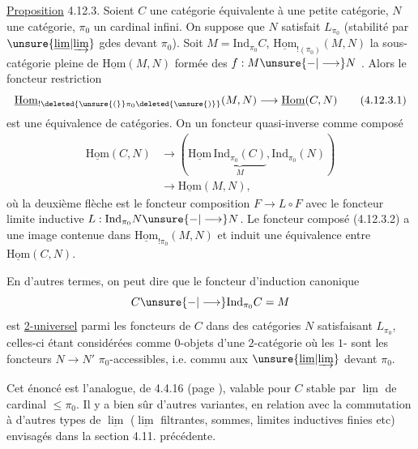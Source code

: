 \uline{Proposition} 4.12.3. Soient $C$ une catégorie
équivalente à une petite catégorie, $N$
une catégorie, $\pi_0$ un cardinal infini.
On suppose que $N$ satisfait $L_{\pi_0}$ (stabilité
par $\unsure{\underline{\lim}|\underrightarrow{\lim}}$ gdes devant $\pi_0$). Soit $M=\mathrm{Ind}_{\pi_0}C$,
$\underline{\mathrm{Hom}}_{!(\pi_0)}(M,N)$ la sous-catégorie  pleine
de $\underline{\mathrm{Hom}}(M,N)$ formée des $f:M\unsure{-|\longrightarrow}N$
. Alors le foncteur
restriction
\[
 \underline{\mathrm{Hom}}_{!\deleted{\unsure{(}}\pi_0\deleted{\unsure{)}}}(M,N)
 \longrightarrow\underline{\mathrm{Hom}}(C,N) \tag*{(4.12.3.1)}
\]
est une équivalence de catégories.
On  un foncteur quasi-inverse
comme composé
\[
\begin{aligned}
 \underline{\mathrm{Hom}}(C,N)&\longrightarrow
 (\underline{\mathrm{Hom}}\,\underbrace{\mathrm{Ind}_{\pi_0}(C)}_{M},\mathrm{Ind}_{\pi_0}(N))\\
 &\longrightarrow\underline{\mathrm{Hom}}(M,N),
\end{aligned}\tag*{(4.12.3.2)}
\]
où la deuxième flèche est le foncteur
composition $F\to L\circ F$ avec le foncteur
limite inductive $L:\mathrm{Ind}_{\pi_0}N\unsure{-|\longrightarrow}N$.
Le foncteur composé (4.12.3.2) 
a une image contenue dans $\underline{\mathrm{Hom}}_{!\pi_0}(M,N)$
et induit une équivalence entre 
$\underline{\mathrm{Hom}}(C,N)$. 

En d'autres termes, on peut dire que
le foncteur d'induction canonique
\[
 C\unsure{-|\longrightarrow}\mathrm{Ind}_{\pi_0}C=M
\]
est \uline{2-universel} parmi les foncteurs de
$C$ dans des catégories $N$ satisfaisant $L_{\pi_0}$,
celles-ci  étant considérées comme
$0$-objets d'une $2$-catégorie où les
$1$- sont les foncteurs $N\longrightarrow N'$
$\pi_0$-accessibles, i.e. commu aux
$\unsure{\underline{\lim}|\underrightarrow{\lim}}$  devant $\pi_0$.

Cet énoncé est l'analogue,  de 4.4.16
(page ), valable pour $C$ stable par
$\underline{\lim}$ de cardinal $\leq\pi_0$. Il y a bien
sûr d'autres variantes, en relation avec
la  commutation à d'autres
types de $\underline{\lim}$ ($\underline{\lim}$ filtrantes, sommes,
limites inductives finies etc) envisagés
dans la section 4.11. précédente.

